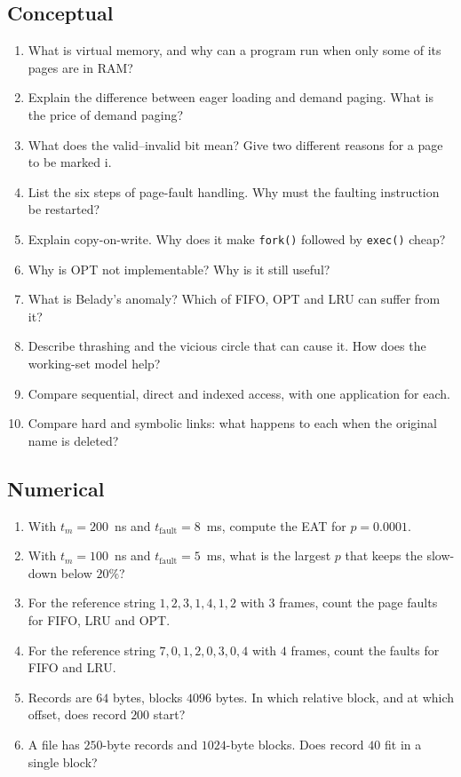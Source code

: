 \documentclass[11pt,a4paper]{article}
\newcommand{\cmd}[1]{\texttt{#1}}
\begin{document}
\subsection*{Conceptual}
\begin{enumerate}[leftmargin=1.6em]
  \item What is virtual memory, and why can a program run when only some of its pages are in RAM?
  \item Explain the difference between eager loading and demand paging. What is the price of demand paging?
  \item What does the valid--invalid bit mean? Give two different reasons for a page to be marked i.
  \item List the six steps of page-fault handling. Why must the faulting instruction be restarted?
  \item Explain copy-on-write. Why does it make \cmd{fork()} followed by \cmd{exec()} cheap?
  \item Why is OPT not implementable? Why is it still useful?
  \item What is Belady's anomaly? Which of FIFO, OPT and LRU can suffer from it?
  \item Describe thrashing and the vicious circle that can cause it. How does the working-set model help?
  \item Compare sequential, direct and indexed access, with one application for each.
  \item Compare hard and symbolic links: what happens to each when the original name is deleted?
\end{enumerate}

\subsection*{Numerical}
\begin{enumerate}[leftmargin=1.6em,resume]
  \item With $t_m = 200$~ns and $t_{\text{fault}} = 8$~ms, compute the EAT for $p = 0.0001$.
  \item With $t_m = 100$~ns and $t_{\text{fault}} = 5$~ms, what is the largest $p$ that keeps the slow-down below $20\%$?
  \item For the reference string $1, 2, 3, 1, 4, 1, 2$ with $3$ frames, count the page faults for FIFO, LRU and OPT.
  \item For the reference string $7, 0, 1, 2, 0, 3, 0, 4$ with $4$ frames, count the faults for FIFO and LRU.
  \item Records are $64$ bytes, blocks $4096$ bytes. In which relative block, and at which offset, does record $200$ start?
  \item A file has $250$-byte records and $1024$-byte blocks. Does record $40$ fit in a single block?
\end{enumerate}
\end{document}
